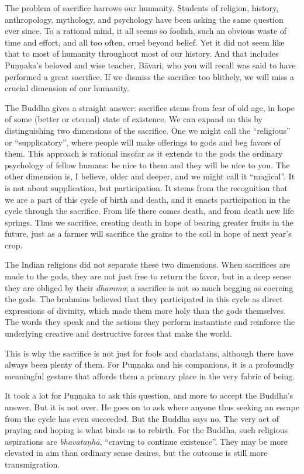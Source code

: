 \documentclass[12pt,openany]{book}%
\begin{document}
The problem of sacrifice harrows our humanity. Students of religion, history, anthropology, mythology, and psychology have been asking the same question ever since. To a rational mind, it all seems so foolish, such an obvious waste of time and effort, and all too often, cruel beyond belief. Yet it did not seem like that to most of humanity throughout most of our history. And that includes \textsanskrit{Puṇṇaka}’s beloved and wise teacher, \textsanskrit{Bāvari}, who you will recall was said to have performed a great sacrifice. If we dismiss the sacrifice too blithely, we will miss a crucial dimension of our humanity.

The Buddha gives a straight answer: sacrifice stems from fear of old age, in hope of some (better or eternal) state of existence. We can expand on this by distinguishing two dimensions of the sacrifice. One we might call the “religious” or “supplicatory”, where people will make offerings to gods and beg favors of them. This approach is rational insofar as it extends to the gods the ordinary psychology of fellow humans: be nice to them and they will be nice to you. The other dimension is, I believe, older and deeper, and we might call it “magical”. It is not about supplication, but participation. It stems from the recognition that we are a part of this cycle of birth and death, and it enacts participation in the cycle through the sacrifice. From life there comes death, and from death new life springs. Thus we sacrifice, creating death in hope of bearing greater fruits in the future, just as a farmer will sacrifice the grains to the soil in hope of next year’s crop.

The Indian religions did not separate these two dimensions. When sacrifices are made to the gods, they are not just free to return the favor, but in a deep sense they are obliged by their \textit{dhamma}; a sacrifice is not so much begging as coercing the gods. The brahmins believed that they participated in this cycle as direct expressions of divinity, which made them more holy than the gods themselves. The words they speak and the actions they perform instantiate and reinforce the underlying creative and destructive forces that make the world.

This is why the sacrifice is not just for fools and charlatans, although there have always been plenty of them. For \textsanskrit{Puṇṇaka} and his companions, it is a profoundly meaningful gesture that affords them a primary place in the very fabric of being.

It took a lot for \textsanskrit{Puṇṇaka} to ask this question, and more to accept the Buddha’s answer. But it is not over. He goes on to ask where anyone thus seeking an escape from the cycle has even succeeded. But the Buddha says no. The very act of praying and hoping is what binds us to rebirth. For the Buddha, such religious aspirations are \textit{\textsanskrit{bhavataṇhā}}, “craving to continue existence”. They may be more elevated in aim than ordinary sense desires, but the outcome is still more transmigration.
\end{document}
